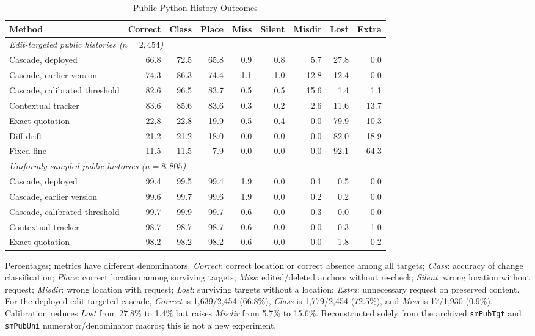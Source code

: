 \documentclass[10pt,conference,letterpaper]{IEEEtran}
\begin{document}
\begin{table}[!t]
\caption{Public Python History Outcomes}
\label{tab:public-only-baselines}
\centering\scriptsize\setlength{\tabcolsep}{3.6pt}
\renewcommand{\arraystretch}{1.18}
\begin{tabular}{lrrrrrrrr}
\hline
Method & Correct & Class & Place & Miss & Silent & Misdir & Lost & Extra \\
\hline
\multicolumn{9}{l}{\emph{Edit-targeted public histories ($n=2,454$)}}\\
Cascade, deployed & 66.8 & 72.5 & 65.8 & 0.9 & 0.8 & 5.7 & 27.8 & 0.0 \\
Cascade, earlier version & 74.3 & 86.3 & 74.4 & 1.1 & 1.0 & 12.8 & 12.4 & 0.0 \\
Cascade, calibrated threshold & 82.6 & 96.5 & 83.7 & 0.5 & 0.5 & 15.6 & 1.4 & 1.1 \\
Contextual tracker & 83.6 & 85.6 & 83.6 & 0.3 & 0.2 & 2.6 & 11.6 & 13.7 \\
Exact quotation & 22.8 & 22.8 & 19.9 & 0.5 & 0.4 & 0.0 & 79.9 & 10.3 \\
Diff drift & 21.2 & 21.2 & 18.0 & 0.0 & 0.0 & 0.0 & 82.0 & 18.9 \\
Fixed line & 11.5 & 11.5 & 7.9 & 0.0 & 0.0 & 0.0 & 92.1 & 64.3 \\
\hline
\multicolumn{9}{l}{\emph{Uniformly sampled public histories ($n=8,805$)}}\\
Cascade, deployed & 99.4 & 99.5 & 99.4 & 1.9 & 0.0 & 0.1 & 0.5 & 0.0 \\
Cascade, earlier version & 99.6 & 99.7 & 99.6 & 1.9 & 0.0 & 0.2 & 0.2 & 0.0 \\
Cascade, calibrated threshold & 99.7 & 99.9 & 99.7 & 0.6 & 0.0 & 0.3 & 0.0 & 0.0 \\
Contextual tracker & 98.7 & 98.7 & 98.7 & 0.6 & 0.0 & 0.0 & 0.3 & 1.0 \\
Exact quotation & 98.2 & 98.2 & 98.2 & 0.6 & 0.0 & 0.0 & 1.8 & 0.2 \\
\hline
\end{tabular}
\parbox{.98\textwidth}{\footnotesize Percentages; metrics have different denominators. \emph{Correct}: correct location or correct absence among all targets; \emph{Class}: accuracy of change classification; \emph{Place}: correct location among surviving targets; \emph{Miss}: edited/deleted anchors without re-check; \emph{Silent}: wrong location without request; \emph{Misdir}: wrong location with request; \emph{Lost}: surviving targets without a location; \emph{Extra}: unnecessary request on preserved content. For the deployed edit-targeted cascade, \emph{Correct} is 1,639/2,454 (66.8\%), \emph{Class} is 1,779/2,454 (72.5\%), and \emph{Miss} is 17/1,930 (0.9\%). Calibration reduces \emph{Lost} from 27.8\% to 1.4\% but raises \emph{Misdir} from 5.7\% to 15.6\%. Reconstructed solely from the archived \texttt{smPubTgt} and \texttt{smPubUni} numerator/denominator macros; this is not a new experiment.}
\end{table}
\end{document}
